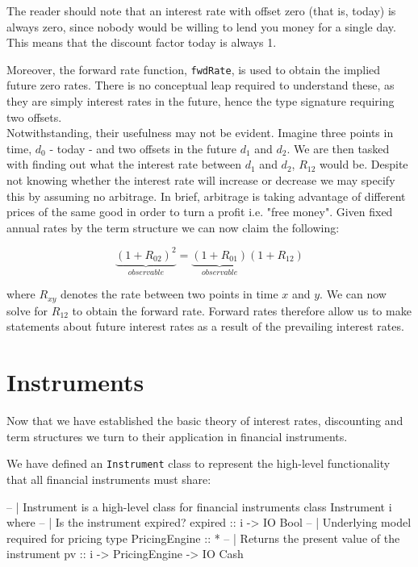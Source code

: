 The reader should note that an interest rate with offset zero (that is, today) is
always zero, since nobody would be willing to lend you money for a single day.
This means that the discount factor today is always 1.

Moreover, the forward rate function, \texttt{fwdRate}, is used to obtain the 
implied future zero rates. There is no conceptual leap required to understand 
these, as they are simply interest rates in the future, hence the type 
signature requiring two offsets.\\
Notwithstanding, their usefulness may not be evident. 
Imagine three points in time, $d_0$ - today - and two
offsets in the future $d_1$ and $d_2$. We are then tasked with finding out
what the interest rate between $d_1$ and $d_2$, $R_{12}$ would be. Despite not 
knowing whether the interest rate will increase or decrease we may specify 
this by assuming no arbitrage. In brief, arbitrage is taking advantage of
different prices of the same good in order to turn a profit i.e. "free money".
Given fixed annual rates by the term structure we can now claim the following:

\begin{equation}
\underbrace{(1+R_{02})^2}_{observable} = \underbrace{(1+R_{01})}_{observable}(1 + R_{12})
\end{equation}

where $R_{xy}$ denotes the rate between two points in time $x$ and $y$. We
can now solve for $R_{12}$ to obtain the forward rate. Forward rates therefore
allow us to make statements about future interest rates as a result of the
prevailing interest rates.

\section{Instruments}\label{sec:instruments}

Now that we have established the basic theory of interest rates, discounting
and term structures we turn to their application in financial instruments.

We have defined an \texttt{Instrument} class to represent the high-level
functionality that all financial instruments must share:

\begin{hscode}
-- | Instrument is a high-level class for financial instruments
class Instrument i where
  -- | Is the instrument expired?
  expired :: i -> IO Bool
  -- | Underlying model required for pricing
  type PricingEngine :: *
  -- | Returns the present value of the instrument
  pv :: i -> PricingEngine -> IO Cash
\end{hscode}

